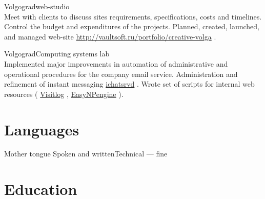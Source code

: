 \documentclass[10pt,a4paper]{moderncv}
\begin{document}
    {Volgograd}{web-studio}{\\ Meet with clients to discuss sites requirements, specifications, costs and timelines. Control the budget and expenditures of the projects. Planned, created, launched, and managed web-site  \href{http://vaultsoft.ru/portfolio/creative-volga}{http://vaultsoft.ru/portfolio/creative-volga} . \newline{}
    }
      
      
      
    {Volgograd}{Computing systems lab}{\\Implemented major improvements in automation of administrative and operational procedures for the company email service. 
        Administration and refinement of instant messaging  \href{http://vaultsoft.ru/portfolio/ichatsrvd}{ichatsrvd} . Wrote set of scripts for internal web resources ( \href{http://vaultsoft.ru/portfolio/visitlog}{Visitlog} ,  \href{http://vaultsoft.ru/portfolio/easynpengine}{EasyNPengine} ).\newline{}
    }
      
      
       
      
    
    
    
  
    \section{Languages}
    {Mother tongue}{\hfill}
    {Spoken and written}{Technical --- fine\hfill}
  
    \section{Education}
\end{document}
